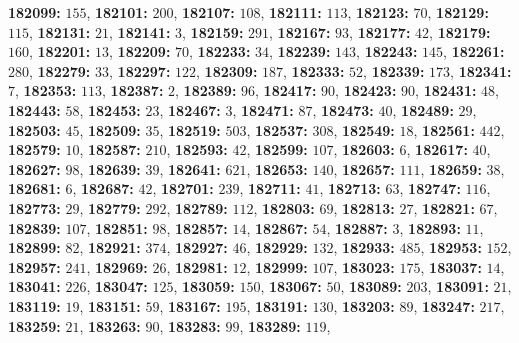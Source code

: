 \textsf{\bfseries 182099:} $155$, \textsf{\bfseries 182101:} $200$, \textsf{\bfseries 182107:} $108$, \textsf{\bfseries 182111:} $113$, \textsf{\bfseries 182123:} $70$, \textsf{\bfseries 182129:} $115$, \textsf{\bfseries 182131:} $21$, \textsf{\bfseries 182141:} $3$, \textsf{\bfseries 182159:} $291$, \textsf{\bfseries 182167:} $93$, \textsf{\bfseries 182177:} $42$, \textsf{\bfseries 182179:} $160$, \textsf{\bfseries 182201:} $13$, \textsf{\bfseries 182209:} $70$, \textsf{\bfseries 182233:} $34$, \textsf{\bfseries 182239:} $143$, \textsf{\bfseries 182243:} $145$, \textsf{\bfseries 182261:} $280$, \textsf{\bfseries 182279:} $33$, \textsf{\bfseries 182297:} $122$, \textsf{\bfseries 182309:} $187$, \textsf{\bfseries 182333:} $52$, \textsf{\bfseries 182339:} $173$, \textsf{\bfseries 182341:} $7$, \textsf{\bfseries 182353:} $113$, \textsf{\bfseries 182387:} $2$, \textsf{\bfseries 182389:} $96$, \textsf{\bfseries 182417:} $90$, \textsf{\bfseries 182423:} $90$, \textsf{\bfseries 182431:} $48$, \textsf{\bfseries 182443:} $58$, \textsf{\bfseries 182453:} $23$, \textsf{\bfseries 182467:} $3$, \textsf{\bfseries 182471:} $87$, \textsf{\bfseries 182473:} $40$, \textsf{\bfseries 182489:} $29$, \textsf{\bfseries 182503:} $45$, \textsf{\bfseries 182509:} $35$, \textsf{\bfseries 182519:} $503$, \textsf{\bfseries 182537:} $308$, \textsf{\bfseries 182549:} $18$, \textsf{\bfseries 182561:} $442$, \textsf{\bfseries 182579:} $10$, \textsf{\bfseries 182587:} $210$, \textsf{\bfseries 182593:} $42$, \textsf{\bfseries 182599:} $107$, \textsf{\bfseries 182603:} $6$, \textsf{\bfseries 182617:} $40$, \textsf{\bfseries 182627:} $98$, \textsf{\bfseries 182639:} $39$, \textsf{\bfseries 182641:} $621$, \textsf{\bfseries 182653:} $140$, \textsf{\bfseries 182657:} $111$, \textsf{\bfseries 182659:} $38$, \textsf{\bfseries 182681:} $6$, \textsf{\bfseries 182687:} $42$, \textsf{\bfseries 182701:} $239$, \textsf{\bfseries 182711:} $41$, \textsf{\bfseries 182713:} $63$, \textsf{\bfseries 182747:} $116$, \textsf{\bfseries 182773:} $29$, \textsf{\bfseries 182779:} $292$, \textsf{\bfseries 182789:} $112$, \textsf{\bfseries 182803:} $69$, \textsf{\bfseries 182813:} $27$, \textsf{\bfseries 182821:} $67$, \textsf{\bfseries 182839:} $107$, \textsf{\bfseries 182851:} $98$, \textsf{\bfseries 182857:} $14$, \textsf{\bfseries 182867:} $54$, \textsf{\bfseries 182887:} $3$, \textsf{\bfseries 182893:} $11$, \textsf{\bfseries 182899:} $82$, \textsf{\bfseries 182921:} $374$, \textsf{\bfseries 182927:} $46$, \textsf{\bfseries 182929:} $132$, \textsf{\bfseries 182933:} $485$, \textsf{\bfseries 182953:} $152$, \textsf{\bfseries 182957:} $241$, \textsf{\bfseries 182969:} $26$, \textsf{\bfseries 182981:} $12$, \textsf{\bfseries 182999:} $107$, \textsf{\bfseries 183023:} $175$, \textsf{\bfseries 183037:} $14$, \textsf{\bfseries 183041:} $226$, \textsf{\bfseries 183047:} $125$, \textsf{\bfseries 183059:} $150$, \textsf{\bfseries 183067:} $50$, \textsf{\bfseries 183089:} $203$, \textsf{\bfseries 183091:} $21$, \textsf{\bfseries 183119:} $19$, \textsf{\bfseries 183151:} $59$, \textsf{\bfseries 183167:} $195$, \textsf{\bfseries 183191:} $130$, \textsf{\bfseries 183203:} $89$, \textsf{\bfseries 183247:} $217$, \textsf{\bfseries 183259:} $21$, \textsf{\bfseries 183263:} $90$, \textsf{\bfseries 183283:} $99$, \textsf{\bfseries 183289:} $119$, 

